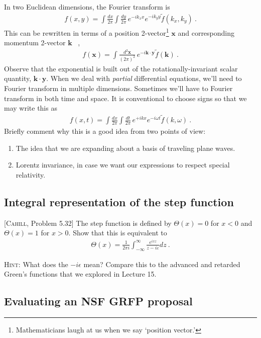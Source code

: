 \documentclass[12pt]{article}
\numberwithin{equation}{subsection}    %
\renewcommand{\tilde}{\widetilde}   %
\renewcommand{\vec}[1]{\mathbf{#1}} %
\begin{document}
In two Euclidean dimensions, the Fourier transform is
\begin{align}
	f(x, y) = \int\frac{dx}{2\pi} \int\frac{dy}{2\pi} \, e^{-ik_xx} e^{-ik_yy} \tilde f(k_x, k_y) \ .
\end{align}
This can be rewritten in terms of a position 2-vector\footnote{Mathematicians laugh at us when we say `position vector.'} $\vec{x}$ and corresponding momentum 2-vector $\vec{k}$ \ , 
\begin{align}
	f(\vec x) = \int\frac{d^2\vec x}{(2\pi)^2}  \, e^{-i\vec k\cdot \vec y} \tilde f(\vec k) \ .
\end{align}
Observe that the exponential is built out of the rotationally-invariant scalar quantity, $\vec k\cdot \vec y$. 
%
When we deal with \emph{partial} differential equations, we'll need to Fourier transform in multiple dimensions. Sometimes we'll have to Fourier transform in both time and space. It is conventional to choose signs so that we may write this as 
\begin{align}
	f(x, t) = \int\frac{dx}{2\pi} \int\frac{dt}{2\pi} \, e^{+ikx} e^{-i\omega t} \tilde f(k, \omega) \ .
\end{align}
Briefly comment why this is a good idea from two points of view:
\begin{enumerate}
	\item The idea that we are expanding about a basis of traveling plane waves. 
	\item Lorentz invariance, in case we want our expressions to respect special relativity.
\end{enumerate}

\subsection{Integral representation of the step function}

[\textsc{Cahill}, Problem 5.32] 
The step function is defined by $\Theta(x) = 0$ for $x<0$ and $\Theta(x) = 1$ for $x>0$. Show that this is equivalent to
\begin{align}
	\Theta(x) = \frac{1}{2\pi i}\int_{-\infty}^\infty \frac{e^{ixz}}{z-i\varepsilon} dz \ .
\end{align}

\textsc{Hint}: What does the $-i\epsilon$ mean? Compare this to the advanced and retarded Green's functions that we explored in Lecture 15. 


\subsection{Evaluating an NSF GRFP proposal}
\end{document}
